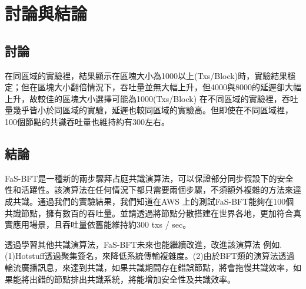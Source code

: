 \chapter{討論與結論}\label{se_8}
\section{討論}\label{se_8} 
在同區域的實驗裡，結果顯示在區塊大小為1000以上(Txs/Block)時，實驗結果穩定；但在區塊大小翻倍情況下，吞吐量並無大幅上升，但4000與8000的延遲卻大幅上升，故較佳的區塊大小選擇可能為1000(Txs/Block)
在不同區域的實驗裡，吞吐量幾乎皆小於同區域的實驗，延遲也較同區域的實驗高。但即使在不同區域裡，100個節點的共識吞吐量也維持約有300左右。

\section{結論}\label{se_8}
FaS-BFT是一種新的兩步驟拜占庭共識演算法，可以保證部分同步假設下的安全性和活躍性。該演算法在任何情況下都只需要兩個步驟，不須額外複雜的方法來達成共識。通過我們的實驗結果，我們知道在AWS 上的測試FaS-BFT能夠在100個共識節點，擁有數百的吞吐量。並請透過將節點分散搭建在世界各地，更加符合真實應用場景，且吞吐量依舊能維持約300 txs / sec。

透過學習其他共識演算法，FaS-BFT未來也能繼續改進，改進該演算法 例如.(1)Hotstuff透過聚集簽名，來降低系統傳輸複雜度。(2)由於BFT類的演算法透過輪流廣播訊息，來達到共識，如果共識期間存在錯誤節點，將會拖慢共識效率，如果能將出錯的節點排出共識系統，將能增加安全性及共識效率。
